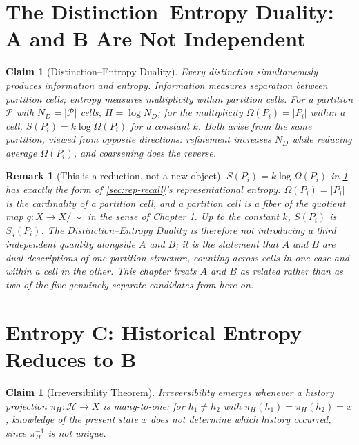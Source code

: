 \documentclass[12pt]{report}
\newtheorem{claim}[definition]{Claim}
\newtheorem{remark}[definition]{Remark}
\begin{document}
\section{The Distinction--Entropy Duality: A and B Are Not Independent}
\label{sec:duality}

\begin{claim}[Distinction--Entropy Duality]
\label{law:duality}
Every distinction simultaneously produces information and entropy.
Information measures separation between partition cells; entropy
measures multiplicity within partition cells. For a partition
$\mathcal{P}$ with $N_D = |\mathcal{P}|$ cells, $H = \log N_D$; for the
multiplicity $\Omega(P_i) = |P_i|$ within a cell, $S(P_i) = k \log
\Omega(P_i)$ for a constant $k$. Both arise from the same partition,
viewed from opposite directions: refinement increases $N_D$ while
reducing average $\Omega(P_i)$, and coarsening does the reverse.
\end{claim}

\begin{remark}[This is a reduction, not a new object]
\label{rem:duality-reduction}
$S(P_i) = k \log \Omega(P_i)$ in \cref{law:duality} has exactly the form
of \cref{sec:rep-recall}'s representational entropy: $\Omega(P_i) =
|P_i|$ is the cardinality of a partition cell, and a partition cell is a
fiber of the quotient map $q : X \to X/{\sim}$ in the sense of Chapter 1.
Up to the constant $k$, $S(P_i)$ \emph{is} $S_q(P_i)$. The
Distinction--Entropy Duality is therefore not introducing a third
independent quantity alongside $A$ and $B$; it is the statement that $A$
and $B$ are dual descriptions of one partition structure, counting across
cells in one case and within a cell in the other. This chapter treats $A$
and $B$ as related rather than as two of the five genuinely separate
candidates from here on.
\end{remark}

\section{Entropy C: Historical Entropy Reduces to B}
\label{sec:historical}

\begin{claim}[Irreversibility Theorem]
\label{thm:irrev}
Irreversibility emerges whenever a history projection $\pi_H : \mathcal{H}
\to X$ is many-to-one: for $h_1 \neq h_2$ with $\pi_H(h_1) = \pi_H(h_2) =
x$, knowledge of the present state $x$ does not determine which history
occurred, since $\pi_H^{-1}$ is not unique.
\end{claim}
\end{document}
